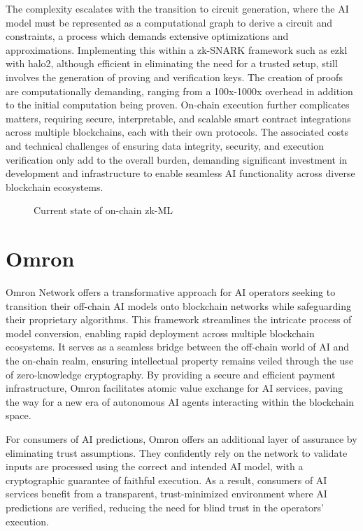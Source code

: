 \documentclass[conference]{IEEEtran}
\begin{document}
The complexity escalates with the transition to circuit generation, where the AI model must be represented as a computational graph to derive a circuit and constraints, a process which demands extensive optimizations and approximations. Implementing this within a zk-SNARK framework such as ezkl with halo2, although efficient in eliminating the need for a trusted setup, still involves the generation of proving and verification keys. The creation of proofs are computationally demanding, ranging from a 100x-1000x overhead in addition to the initial computation being proven. On-chain execution further complicates matters, requiring secure, interpretable, and scalable smart contract integrations across multiple blockchains, each with their own protocols. The associated costs and technical challenges of ensuring data integrity, security, and execution verification only add to the overall burden, demanding significant investment in development and infrastructure to enable seamless AI functionality across diverse blockchain ecosystems.

\begin{figure}[!ht]
    \centering
    
    \caption{Current state of on-chain zk-ML}
    \label{fig:Fig 4}
\end{figure}

\section{Omron}
Omron Network offers a transformative approach for AI operators seeking to transition their off-chain AI models onto blockchain networks while safeguarding their proprietary algorithms. This framework streamlines the intricate process of model conversion, enabling rapid deployment across multiple blockchain ecosystems. It serves as a seamless bridge between the off-chain world of AI and the on-chain realm, ensuring intellectual property remains veiled through the use of zero-knowledge cryptography. By providing a secure and efficient payment infrastructure, Omron facilitates atomic value exchange for AI services, paving the way for a new era of autonomous AI agents interacting within the blockchain space.

For consumers of AI predictions, Omron offers an additional layer of assurance by eliminating trust assumptions. They confidently rely on the network to validate inputs are processed using the correct and intended AI model, with a cryptographic guarantee of faithful execution.  As a result, consumers of AI services benefit from a transparent, trust-minimized environment where AI predictions are verified, reducing the need for blind trust in the operators' execution.
\end{document}
